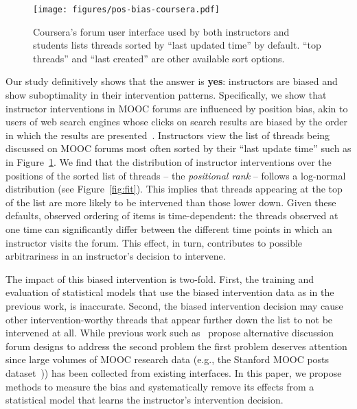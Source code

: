 \documentclass[11pt,a4paper]{article}
\begin{document}
\begin{figure}
\texttt{[image: figures/pos-bias-coursera.pdf]}
\caption{Coursera's forum user interface used by both instructors and
  students lists threads sorted by ``last updated time'' by
  default. ``top threads'' and ``last created'' are other available
  sort options.  }
\label{fig:forum-interface}
\end{figure}

Our study definitively shows that the answer is {\bf yes}: instructors
are biased and show suboptimality in their intervention patterns.
Specifically, we show that instructor interventions in MOOC forums are
influenced by position bias, akin to users of web search engines whose
clicks on search results are biased by the order in which the results
are presented~\cite{joachims2005}. Instructors view the list of
threads being discussed on MOOC forums most often sorted by their
``last update time'' such as in Figure~\ref{fig:forum-interface}. We
find that the distribution of instructor interventions over the
positions of the sorted list of threads -- the \textit{positional
  rank} -- follows a log-normal distribution (see Figure~\ref{fig:fit}). 
This implies that threads appearing at the top of the list are more 
likely to be intervened than those lower down. 
Given these defaults, observed ordering of items is time-dependent:
the threads observed at one time can significantly differ between the
different time points in which an instructor visits the forum.  This
effect, in turn, contributes to possible arbitrariness in an
instructor's decision to intervene.

The impact of this biased intervention is two-fold. 
First, the training and evaluation of statistical models 
that use the biased intervention data as in the previous 
work, is inaccurate. Second, the biased intervention 
decision may cause other intervention-worthy threads 
that appear further down the list to not be intervened at all. 
While previous work such as~\cite{wise2012} propose alternative 
discussion forum designs to address the second
problem the first problem deserves attention since large
volumes of MOOC research data (e.g., the Stanford MOOC posts
dataset~\cite{agrawal2014})) has been collected from existing
interfaces.
In this paper, we propose methods to measure the bias and systematically 
remove its effects from a statistical model that learns the instructor's 
intervention decision.

\end{document}
